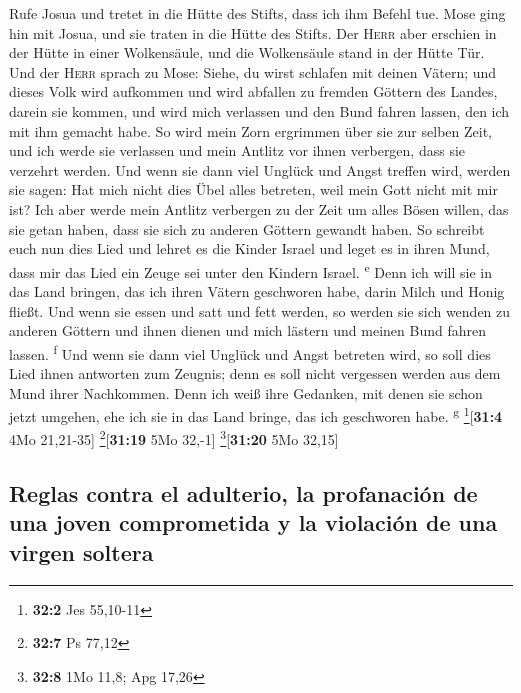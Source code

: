 Rufe Josua und tretet in die Hütte des Stifts, dass ich ihm Befehl tue.
Mose ging hin mit Josua, und sie traten in die Hütte des Stifts.
 Der \textsc{Herr} aber erschien in der Hütte in einer
Wolkensäule, und die Wolkensäule stand in der Hütte Tür. 
Und der \textsc{Herr} sprach zu Mose: Siehe, du wirst schlafen mit
deinen Vätern; und dieses Volk wird aufkommen und wird abfallen zu
fremden Göttern des Landes, darein sie kommen, und wird mich verlassen
und den Bund fahren lassen, den ich mit ihm gemacht habe.
 So wird mein Zorn ergrimmen über sie zur selben Zeit,
und ich werde sie verlassen und mein Antlitz vor ihnen verbergen, dass
sie verzehrt werden. Und wenn sie dann viel Unglück und Angst treffen
wird, werden sie sagen: Hat mich nicht dies Übel alles betreten, weil
mein Gott nicht mit mir ist?  Ich aber werde mein Antlitz
verbergen zu der Zeit um alles Bösen willen, das sie getan haben, dass
sie sich zu anderen Göttern gewandt haben.  So schreibt
euch nun dies Lied und lehret es die Kinder Israel und leget es in ihren
Mund, dass mir das Lied ein Zeuge sei unter den Kindern Israel.
\textsuperscript{e}  Denn ich will sie in das Land
bringen, das ich ihren Vätern geschworen habe, darin Milch und Honig
fließt. Und wenn sie essen und satt und fett werden, so werden sie sich
wenden zu anderen Göttern und ihnen dienen und mich lästern und meinen
Bund fahren lassen. \textsuperscript{f}  Und wenn sie
dann viel Unglück und Angst betreten wird, so soll dies Lied ihnen
antworten zum Zeugnis; denn es soll nicht vergessen werden aus dem Mund
ihrer Nachkommen. Denn ich weiß ihre Gedanken, mit denen sie schon jetzt
umgehen, ehe ich sie in das Land bringe, das ich geschworen habe.
\textsuperscript{g} \footnote{\textbf{32:2} Jes 55,10-11}{[}\textbf{31:4}
4Mo 21,21-35{]} \footnote{\textbf{32:7} Ps 77,12}{[}\textbf{31:19} 5Mo
32,-1{]} \footnote{\textbf{32:8} 1Mo 11,8; Apg 17,26}{[}\textbf{31:20}
5Mo 32,15{]}

\hypertarget{reglas-contra-el-adulterio-la-profanaciuxf3n-de-una-joven-comprometida-y-la-violaciuxf3n-de-una-virgen-soltera}{%
\subsection{Reglas contra el adulterio, la profanación de una joven
comprometida y la violación de una virgen
soltera}\label{reglas-contra-el-adulterio-la-profanaciuxf3n-de-una-joven-comprometida-y-la-violaciuxf3n-de-una-virgen-soltera}}

